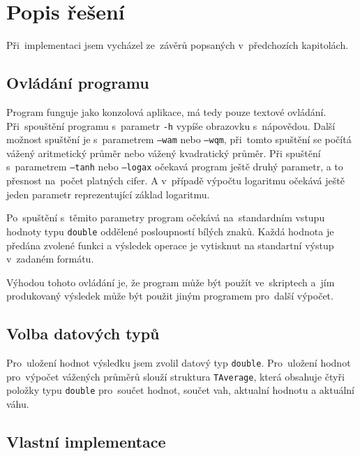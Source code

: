 \documentclass[12pt,a4paper,titlepage,final]{article}
\begin{document}
\section{Popis řešení} \label{popis}

Při~implementaci jsem vycházel ze~závěrů popsaných v~předchozích kapitolách.

\subsection{Ovládání programu}

Program funguje jako konzolová aplikace, má tedy pouze textové ovládání. Při~spouštění
programu s~parametr \texttt{-h} vypíše obrazovku s~nápovědou.
Další možnost spuštění je s~parametrem \texttt{--wam} nebo \texttt{--wqm},
při~tomto spuštění se počítá vážený aritmetický průměr nebo vážený kvadratický
průměr. Při spuštění s~parametrem \texttt{--tanh} nebo \texttt{--logax} očekavá
program ještě druhý parametr, a to přesnost na~počet platných cifer. A v~případě
výpočtu logaritmu očekává ještě jeden parametr reprezentující základ logaritmu. 

Po~spuštění s~těmito parametry program očekává na~standardním vstupu 
hodnoty typu \texttt{double} oddělené posloupností bílých znaků.
Každá hodnota je předána zvolené funkci a výsledek operace je vytisknut
na standartní výstup v~zadaném formátu.

Výhodou tohoto ovládání je, že program může být použít ve~skriptech
a~jím produkovaný výsledek může být použit jiným
programem pro~další výpočet.

\subsection{Volba datových typů}

Pro~uložení hodnot výsledku jsem zvolil datový typ \texttt{double}.
Pro~uložení hodnot pro~výpočet vážených průměrů slouží struktura \texttt{TAverage},
která obsahuje čtyři položky typu \texttt{double} pro~sou\-čet hodnot, součet vah, aktualní hodnotu
a aktuální váhu.

\subsection{Vlastní implementace}
\end{document}

